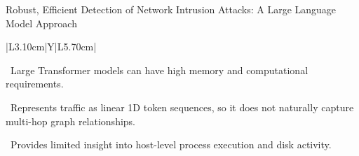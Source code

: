 \begin{frame}[t]{Robust, Efficient Detection of Network Intrusion Attacks: A Large Language Model Approach}
{\begin{tabularx}{\textwidth}{|L{3.10cm}|Y|L{5.70cm}|}
\begin{minipage}[t]{\linewidth}
\textbullet~Large Transformer models can have high memory and computational requirements.\par\vspace{1.8pt}\textbullet~Represents traffic as linear 1D token sequences, so it does not naturally capture multi-hop graph relationships.\par\vspace{1.8pt}\textbullet~Provides limited insight into host-level process execution and disk activity.\par\vspace{3pt}
\end{minipage} \\\hline
\end{tabularx}}
\end{frame}

